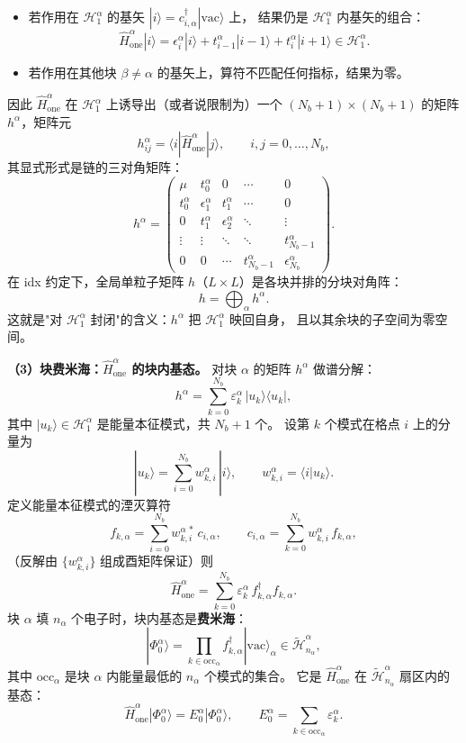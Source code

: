 \documentclass[11pt]{ctexart}
\begin{document}
\begin{itemize}
\item 若作用在 $\mathcal{H}_1^\alpha$ 的基矢 $|i\rangle=c_{i,\alpha}^{\dagger}|\mathrm{vac}\rangle$ 上，
结果仍是 $\mathcal{H}_1^\alpha$ 内基矢的组合：
\[
\hat H_{\mathrm{one}}^{\alpha}|i\rangle
=
\epsilon_i^{\alpha}|i\rangle
+t_{i-1}^{\alpha}|i-1\rangle
+t_i^{\alpha}|i+1\rangle\in\mathcal{H}_1^\alpha .
\]
\item 若作用在其他块 $\beta\neq\alpha$ 的基矢上，算符不匹配任何指标，结果为零。
\end{itemize}

因此 $\hat H_{\mathrm{one}}^{\alpha}$ 在 $\mathcal{H}_1^\alpha$ 上诱导出（或者说限制为）一个
$(N_b+1)\times(N_b+1)$ 的矩阵 $h^\alpha$，矩阵元
\[
h^\alpha_{ij}=\langle i|\hat H_{\mathrm{one}}^{\alpha}|j\rangle,\qquad i,j=0,\dots,N_b,
\]
其显式形式是链的三对角矩阵：
\[
h^\alpha=
\begin{pmatrix}
\mu & t_0^{\alpha} & 0 & \cdots & 0\\
t_0^{\alpha} & \epsilon_1^{\alpha} & t_1^{\alpha} & \cdots & 0\\
0 & t_1^{\alpha} & \epsilon_2^{\alpha} & \ddots & \vdots\\
\vdots & \vdots & \ddots & \ddots & t_{N_b-1}^{\alpha}\\
0 & 0 & \cdots & t_{N_b-1}^{\alpha} & \epsilon_{N_b}^{\alpha}
\end{pmatrix}.
\]
在 idx 约定下，全局单粒子矩阵 $h$（$L\times L$）是各块并排的分块对角阵：
\[
h=\bigoplus_{\alpha}h^\alpha .
\]
这就是"对 $\mathcal{H}_1^\alpha$ 封闭"的含义：$h^\alpha$ 把 $\mathcal{H}_1^\alpha$ 映回自身，
且以其余块的子空间为零空间。

\textbf{（3）块费米海：$\hat H_{\mathrm{one}}^{\alpha}$ 的块内基态。}
对块 $\alpha$ 的矩阵 $h^\alpha$ 做谱分解：
\[
h^\alpha=\sum_{k=0}^{N_b}\varepsilon_k^{\alpha}\,|u_k\rangle\langle u_k|,
\]
其中 $|u_k\rangle\in\mathcal{H}_1^\alpha$ 是能量本征模式，共 $N_b+1$ 个。
设第 $k$ 个模式在格点 $i$ 上的分量为
\[
|u_k\rangle=\sum_{i=0}^{N_b}w_{k,i}^{\alpha}\,|i\rangle,
\qquad w_{k,i}^{\alpha}=\langle i|u_k\rangle .
\]
定义能量本征模式的湮灭算符
\[
f_{k,\alpha}=\sum_{i=0}^{N_b}w_{k,i}^{\alpha\,*}\,c_{i,\alpha},
\qquad
c_{i,\alpha}=\sum_{k=0}^{N_b}w_{k,i}^{\alpha}\,f_{k,\alpha},
\]
（反解由 $\{w_{k,i}^{\alpha}\}$ 组成酉矩阵保证）则
\[
\hat H_{\mathrm{one}}^{\alpha}
=\sum_{k=0}^{N_b}\varepsilon_k^{\alpha}\,f_{k,\alpha}^{\dagger}f_{k,\alpha}.
\]
块 $\alpha$ 填 $n_\alpha$ 个电子时，块内基态是\textbf{费米海}：
\[
|\Phi_0^{\alpha}\rangle
=\prod_{k\in\mathrm{occ}_\alpha}f_{k,\alpha}^{\dagger}|\mathrm{vac}\rangle_\alpha
\in\tilde{\mathcal{H}}_{n_\alpha}^\alpha ,
\]
其中 $\mathrm{occ}_\alpha$ 是块 $\alpha$ 内能量最低的 $n_\alpha$ 个模式的集合。
它是 $\hat H_{\mathrm{one}}^{\alpha}$ 在 $\tilde{\mathcal{H}}_{n_\alpha}^\alpha$ 扇区内的基态：
\[
\hat H_{\mathrm{one}}^{\alpha}|\Phi_0^{\alpha}\rangle
=E_0^{\alpha}|\Phi_0^{\alpha}\rangle,
\qquad
E_0^{\alpha}=\sum_{k\in\mathrm{occ}_\alpha}\varepsilon_k^{\alpha} .
\]
\end{document}
